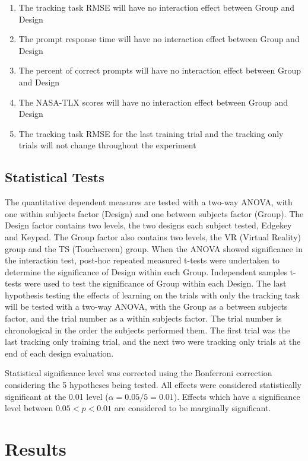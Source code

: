 \begin{enumerate}[label={H\arabic*.}]
    \item The tracking task RMSE will have no interaction effect between Group and Design
    \item The prompt response time will have no interaction effect between Group and Design
    \item The percent of correct prompts will have no interaction effect between Group and Design
    \item The NASA-TLX scores will have no interaction effect between Group and Design
    \item The tracking task RMSE for the last training trial and the tracking only trials will not change throughout the experiment
\end{enumerate}

\subsection{Statistical Tests}

The quantitative dependent measures are tested with a two-way ANOVA, with one within subjects factor (Design) and one between subjects factor (Group).
The Design factor contains two levels, the two designs each subject tested, Edgekey and Keypad.
The Group factor also contains two levels, the VR (Virtual Reality) group and the TS (Touchscreen) group.
When the ANOVA showed significance in the interaction test, post-hoc repeated measured t-tests were undertaken to determine the significance of Design within each Group.
Independent samples t-tests were used to test the significance of Group within each Design.
The last hypothesis testing the effects of learning on the trials with only the tracking task will be tested with a two-way ANOVA, with the Group as a between subjects factor, and the trial number as a within subjects factor.
The trial number is chronological in the order the subjects performed them.
The first trial was the last tracking only training trial, and the next two were tracking only trials at the end of each design evaluation.

Statistical significance level was corrected using the Bonferroni correction considering the 5 hypotheses being tested.
All effects were considered statistically significant at the 0.01 level ($\alpha = 0.05/5 = 0.01$).
Effects which have a significance level between $0.05<p<0.01$ are considered to be marginally significant.

\section{Results}

